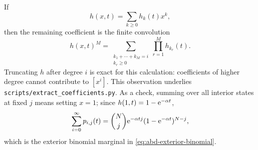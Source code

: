 If
\begin{equation}
  h(x,t)=\sum_{k\geq0}h_k(t)x^k,
\end{equation}
then the remaining coefficient is the finite convolution
\begin{equation}
  [x^i]h(x,t)^M
  =
  \sum_{\substack{k_1+\cdots+k_M=i\\k_r\geq0}}
  \prod_{r=1}^{M}h_{k_r}(t).
  \label{eq:coefficient-convolution}
\end{equation}
Truncating \(h\) after degree \(i\) is exact for this calculation: coefficients of
higher degree cannot contribute to \([x^i]\).  This observation underlies
\texttt{scripts/extract\_coefficients.py}.  As a check, summing over all interior
states at fixed \(j\) means setting \(x=1\); since
\(h(1,t)=1-\mathrm{e}^{-\alpha t}\),
\begin{equation}
  \sum_{i=0}^{\infty}p_{i,j}(t)
  =
  \binom Nj
  \mathrm{e}^{-\alpha tj}
  (1-\mathrm{e}^{-\alpha t})^{N-j},
\end{equation}
which is the exterior binomial marginal in
\cref{eq:abd-exterior-binomial}.

